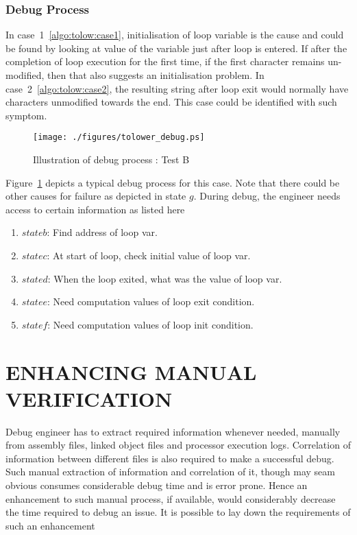 \subsubsection{Debug Process}

In case~1~\ref{algo:tolow:case1}, initialisation of loop variable is the cause and could be found by looking at value of the variable just after loop is entered. If after the completion of loop execution for the first time, if the first character remains un-modified, then that also suggests an initialisation problem.
In case~2~\ref{algo:tolow:case2}, the resulting string after loop exit would normally have characters unmodified towards the end. This case could be identified with such symptom.

\begin{figure}[h]
\centering
\texttt{[image: ./figures/tolower\_debug.ps]}
\caption{Illustration of debug process : Test B} 
\label{fig:tolower_debug.ps}
\end{figure}

Figure~\ref{fig:tolower_debug.ps} depicts a typical debug process for this case. Note that there could be other causes for failure as depicted in state $g$. During debug, the engineer needs access to certain information as listed here

\begin{enumerate}
\item $state b$: Find address of loop var.
\item $state c$: At start of loop, check initial value of loop var.
\item $state d$: When the loop exited, what was the value of loop var.
\item $state e$: Need computation values of loop exit condition.
\item $state f$: Need computation values of loop init condition.
\end{enumerate}

\section {ENHANCING MANUAL VERIFICATION}
Debug engineer has to extract required information whenever needed, manually from assembly files, linked object files and processor execution logs. Correlation of information between different files is also required to make a successful debug. Such manual extraction of information and correlation of it, though may seam obvious consumes considerable debug time and is error prone. Hence an enhancement to such manual process, if available, would considerably decrease the time required to debug an issue. It is possible to lay down the requirements of such an enhancement

